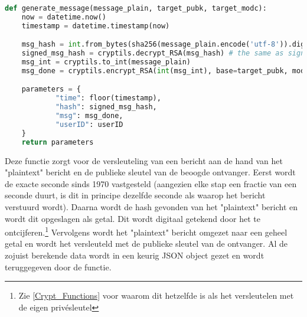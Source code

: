 \documentclass{report} %
\begin{document}
\begin{lstlisting}[language=Python, firstnumber=41]
def generate_message(message_plain, target_pubk, target_modc):
    now = datetime.now()
    timestamp = datetime.timestamp(now)

    msg_hash = int.from_bytes(sha256(message_plain.encode('utf-8')).digest(), 'big')
    signed_msg_hash = cryptils.decrypt_RSA(msg_hash) # the same as signing :wow:
    msg_int = cryptils.to_int(message_plain)
    msg_done = cryptils.encrypt_RSA(int(msg_int), base=target_pubk, modulo=target_modc) # or: encrypt with public key

    parameters = {
            "time": floor(timestamp),
            "hash": signed_msg_hash,
            "msg": msg_done,
            "userID": userID
    }
    return parameters
\end{lstlisting}
Deze functie zorgt voor de versleuteling van een bericht aan de hand van het "plaintext" bericht en de publieke sleutel van de beoogde ontvanger. Eerst wordt de exacte seconde sinds 1970 vastgesteld (aangezien elke stap een fractie van een seconde duurt, is dit in principe dezelfde seconde als waarop het bericht verstuurd wordt). Daarna wordt de hash gevonden van het "plaintext" bericht en wordt dit opgeslagen als getal. Dit wordt digitaal getekend door het te ontcijferen.\footnote{Zie \ref{Crypt_Functions} voor waarom dit hetzelfde is als het versleutelen met de eigen privésleutel} Vervolgens wordt het "plaintext" bericht omgezet naar een geheel getal en wordt het versleuteld met de publieke sleutel van de ontvanger. Al de zojuist berekende data wordt in een keurig JSON object gezet en wordt teruggegeven door de functie.
\end{document}
